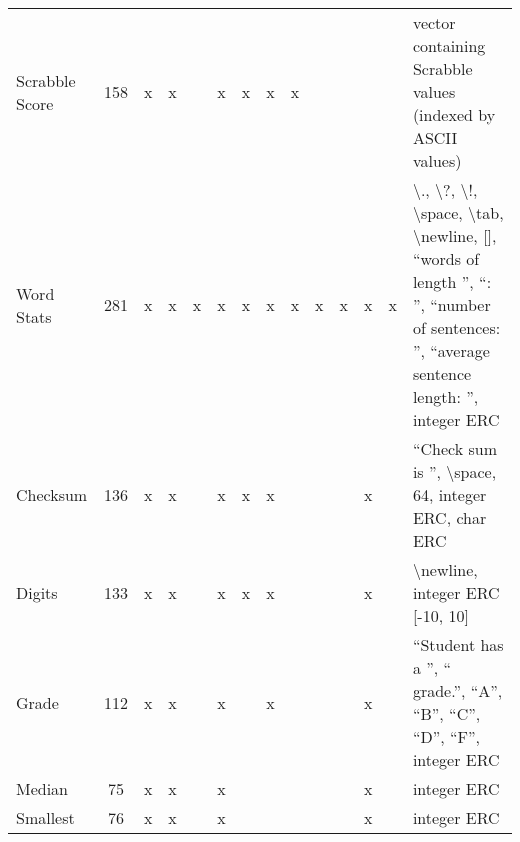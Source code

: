 \documentclass{sig-alternate}
\begin{document}
\begin{table*}
\begin{tabular}{>{\raggedright}p{3.1cm}cccccccccccc>{\raggedright}p{5.5cm}}
Scrabble Score             & 158             & x    & x       &       & x       & x    & x      & x                  &                  &                   &       &            & vector containing Scrabble values (indexed by ASCII values)                                                                                                                                                                 \tabularnewline
Word Stats                 & 281             & x    & x       & x     & x       & x    & x      & x                  & x                & x                 & x     & x          & \textbackslash ., \textbackslash ?, \textbackslash !, \textbackslash space, \textbackslash tab, \textbackslash newline, {[}{]}, ``words of length '', ``: '', ``number of sentences: '', ``average sentence length: '', integer ERC \tabularnewline
Checksum                   & 136             & x    & x       &       & x       & x    & x      &                    &                  &                   & x     &            & ``Check sum is '', \textbackslash space, 64, integer ERC, char ERC                                                                                                                                                            \tabularnewline
Digits                     & 133             & x    & x       &       & x       & x    & x      &                    &                  &                   & x     &            & \textbackslash newline, integer ERC {[}-10, 10{]}                                                                                                                                                                           \tabularnewline
Grade                      & 112             & x    & x       &       & x       &      & x      &                    &                  &                   & x     &            & ``Student has a '', `` grade.'', ``A'', ``B'', ``C'', ``D'', ``F'', integer ERC                                                                                                                                                           \tabularnewline
Median                     & 75              & x    & x       &       & x       &      &        &                    &                  &                   & x     &            & integer ERC                                                                                                                                                                                                                 \tabularnewline
Smallest                   & 76              & x    & x       &       & x       &      &        &                    &                  &                   & x     &            & integer ERC                                                                                                                                                                                                                 \tabularnewline

\end{tabular}
\end{table*}
\end{document}
